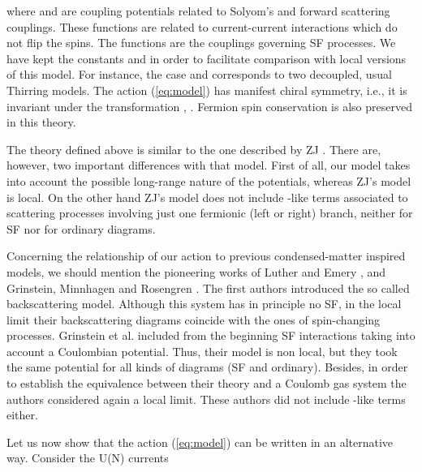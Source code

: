 \documentclass[a4paper,a4paper]{article}
\begin{document}
\noindent where \coordHE{} and \coordHE{} are coupling potentials related to
Solyom's \cite{Solyom} \coordHE{} and \coordHE{} forward scattering couplings. These functions
are related to current-current interactions which do not flip the spins. The functions
\coordHE{} are the couplings governing SF processes. We have kept the constants
\coordHE{} and \coordHE{} in order to facilitate comparison with local versions of this model. For
instance, the case \coordHE{} and \coordHE{} corresponds to
two decoupled, usual Thirring models.  The action (\ref{eq:model}) has manifest \coordHE{}
chiral symmetry, i.e., it is invariant under the transformation \coordHE{}, \coordHE{}.
Fermion spin conservation is also preserved in this theory.

The theory defined above is similar to the one described by ZJ \cite{Zinn-Justin}.
There are, however, two important differences with that model. First of all, our model
takes into account the possible long-range nature of the potentials, whereas ZJ's
model is local. On the other hand ZJ's model does not include \coordHE{}-like terms
associated to scattering processes involving just one fermionic (left or right)
branch, neither for SF nor for ordinary diagrams.

Concerning the relationship of our action to previous condensed-matter inspired
models, we should mention the pioneering works of Luther and Emery
\cite{Luther-Emery}, and Grinstein, Minnhagen and Rosengren \cite{GMR}. The first
authors introduced the so called backscattering model. Although this system has in
principle no SF, in the local limit their backscattering diagrams coincide with the
ones of spin-changing processes. Grinstein et al. included from the beginning SF
interactions taking into account a Coulombian potential. Thus, their model is non
local, but they took the same potential for all kinds of diagrams (SF and ordinary).
Besides, in order to establish the equivalence between their theory and a Coulomb gas
system the authors considered again a local limit. These authors did not include
\coordHE{}-like terms either.

Let us now show that the action (\ref{eq:model}) can be written in an alternative way.
Consider the U(N) currents
\end{document}
